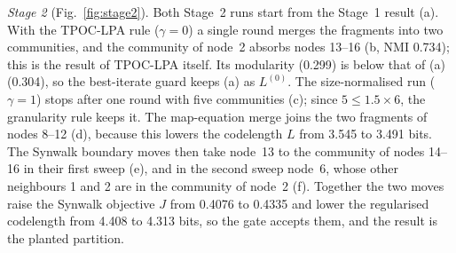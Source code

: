 \documentclass[conference]{IEEEtran}
\begin{document}
\emph{Stage 2} (Fig.~\ref{fig:stage2}). Both Stage~2 runs start from the Stage~1 result (a). With the TPOC-LPA rule ($\gamma=0$) a single round merges the fragments into two communities, and the community of node~2 absorbs nodes 13--16 (b, NMI 0.734); this is the result of TPOC-LPA itself. Its modularity (0.299) is below that of (a) (0.304), so the best-iterate guard keeps (a) as $L^{(0)}$. The size-normalised run ($\gamma=1$) stops after one round with five communities (c); since $5\le1.5\times6$, the granularity rule keeps it. The map-equation merge joins the two fragments of nodes 8--12 (d), because this lowers the codelength $L$ from 3.545 to 3.491 bits. The Synwalk boundary moves then take node~13 to the community of nodes 14--16 in their first sweep (e), and in the second sweep node~6, whose other neighbours 1 and 2 are in the community of node~2 (f). Together the two moves raise the Synwalk objective $J$ from 0.4076 to 0.4335 and lower the regularised codelength from 4.408 to 4.313 bits, so the gate accepts them, and the result is the planted partition.
\end{document}
